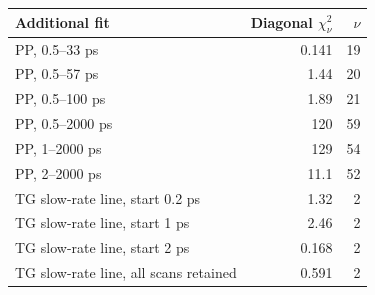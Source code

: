 \begin{center}\small\begin{tabular}{lrr}\toprule
Additional fit & Diagonal $\chi^2_\nu$ & $\nu$\\\midrule
PP, 0.5--33 ps & 0.141 & 19\\
PP, 0.5--57 ps & 1.44 & 20\\
PP, 0.5--100 ps & 1.89 & 21\\
PP, 0.5--2000 ps & 120 & 59\\
PP, 1--2000 ps & 129 & 54\\
PP, 2--2000 ps & 11.1 & 52\\
TG slow-rate line, start 0.2 ps & 1.32 & 2\\
TG slow-rate line, start 1 ps & 2.46 & 2\\
TG slow-rate line, start 2 ps & 0.168 & 2\\
TG slow-rate line, all scans retained & 0.591 & 2\\
\bottomrule\end{tabular}\end{center}
